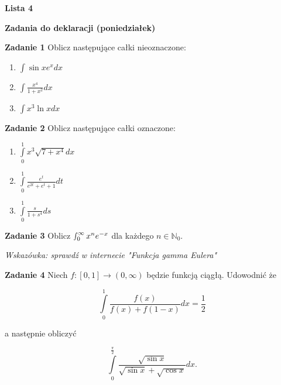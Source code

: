 \documentclass[a4paper,11pt]{article}
\begin{document}
\begin{center}
  {\large\textbf{Lista 4}}
\end{center}

\hrulefill
\begin{center}
    \textbf{Zadania do deklaracji (poniedziałek)}
\end{center}

\bigskip

\textbf{Zadanie 1} Oblicz następujące całki nieoznaczone:

\begin{multicols}{3}
    \begin{enumerate}
        \item $\int \sin x e^x dx$
        \item $\int \frac{x^4}{1+x^2} dx$
        \item $\int x^3 \ln x dx$
    \end{enumerate}
\end{multicols}

\bigskip

\textbf{Zadanie 2} Oblicz następujące całki oznaczone:

\begin{multicols}{3}
    \begin{enumerate}
        \item $\int \limits_0^1 x^3 \sqrt{7+x^4} dx$
        \item $\int \limits_0^1 \frac{e^t}{e^{2t} + e^t + 1} dt$
        \item $\int \limits_0^1 \frac{s}{1+s^4} ds$
    \end{enumerate}
\end{multicols}

\bigskip

\textbf{Zadanie 3} Oblicz $\smallint_0^\infty x^n e^{-x}$ dla
każdego $n \in \mathbb{N}_0$.

\textit{Wskazówka: sprawdź w internecie "Funkcja gamma Eulera"}

\bigskip

\textbf{Zadanie 4} Niech $f: [0,1] \to (0,\infty)$ będzie funkcją 
ciągłą. Udowodnić że 

$$\int \limits_0^1 \frac{f(x)}{f(x) + f(1-x)} dx = \frac{1}{2}$$

a następnie obliczyć

$$\int \limits_0^{\frac{\pi}{2}} \frac{\sqrt{\sin x}}{\sqrt{\sin x} + \sqrt{\cos x}} dx.$$

\bigskip

\hrulefill
\end{document}
